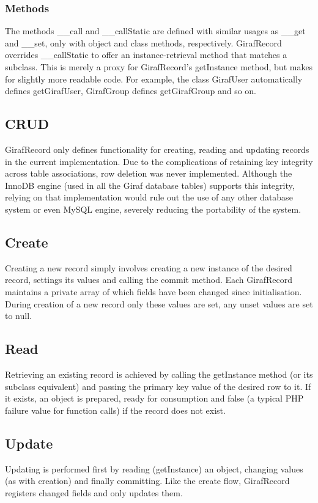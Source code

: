 \subsubsection*{Methods}
The methods \_\_call and \_\_callStatic are defined with similar usages as \_\_get and \_\_set, only with object and class methods, respectively. GirafRecord overrides \_\_callStatic to offer an instance-retrieval method that matches a subclass. This is merely a proxy for GirafRecord's getInstance method, but makes for slightly more readable code. For example, the class GirafUser automatically defines getGirafUser, GirafGroup defines getGirafGroup and so on.

\subsection{CRUD}
GirafRecord only defines functionality for creating, reading and updating records in the current implementation. Due to the complications of retaining key integrity across table associations, row deletion was never implemented. Although the InnoDB engine (used in all the Giraf database tables) supports this integrity, relying on that implementation would rule out the use of any other database system or even MySQL engine, severely reducing the portability of the system.

\subsection*{Create}
Creating a new record simply involves creating a new instance of the desired record, settings its values and calling the commit method. Each GirafRecord maintains a private array of which fields have been changed since initialisation. During creation of a new record only these values are set, any unset values are set to null.

\subsection*{Read}
Retrieving an existing record is achieved by calling the getInstance method (or its subclass equivalent) and passing the primary key value of the desired row to it. If it exists, an object is prepared, ready for consumption and false (a typical PHP failure value for function calls) if the record does not exist.

\subsection*{Update}
Updating is performed first by reading (getInstance) an object, changing values (as with creation) and finally committing. Like the create flow, GirafRecord registers changed fields and only updates them.

